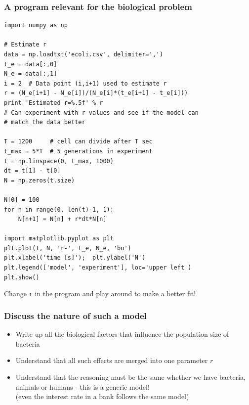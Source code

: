 \documentclass{beamer}
\begin{document}
\begin{frame}
\frametitle{A program relevant for the biological problem}


\begin{block}{}
\begin{verbatim}
import numpy as np

# Estimate r
data = np.loadtxt('ecoli.csv', delimiter=',')
t_e = data[:,0]
N_e = data[:,1]
i = 2  # Data point (i,i+1) used to estimate r
r = (N_e[i+1] - N_e[i])/(N_e[i]*(t_e[i+1] - t_e[i]))
print 'Estimated r=%.5f' % r
# Can experiment with r values and see if the model can
# match the data better

T = 1200     # cell can divide after T sec
t_max = 5*T  # 5 generations in experiment
t = np.linspace(0, t_max, 1000)
dt = t[1] - t[0]
N = np.zeros(t.size)

N[0] = 100
for n in range(0, len(t)-1, 1):
    N[n+1] = N[n] + r*dt*N[n]

import matplotlib.pyplot as plt
plt.plot(t, N, 'r-', t_e, N_e, 'bo')
plt.xlabel('time [s]');  plt.ylabel('N')
plt.legend(['model', 'experiment'], loc='upper left')
plt.show()
\end{verbatim}

Change \Verb!r! in the program and play around to make a better fit!
\end{block}
\end{frame}

\begin{frame}
\frametitle{Discuss the nature of such a model}

\begin{block}{}
\begin{itemize}
 \item Write up all the biological factors that influence the
   population size of bacteria

 \item Understand that all such effects are merged into one parameter $r$

 \item Understand that the reasoning must be the same whether we
   have bacteria, animals or humans - this is a generic model!\\
   (even the interest rate in a bank follows the same model)
\end{itemize}

\noindent
\end{block}
\end{frame}
\end{document}
